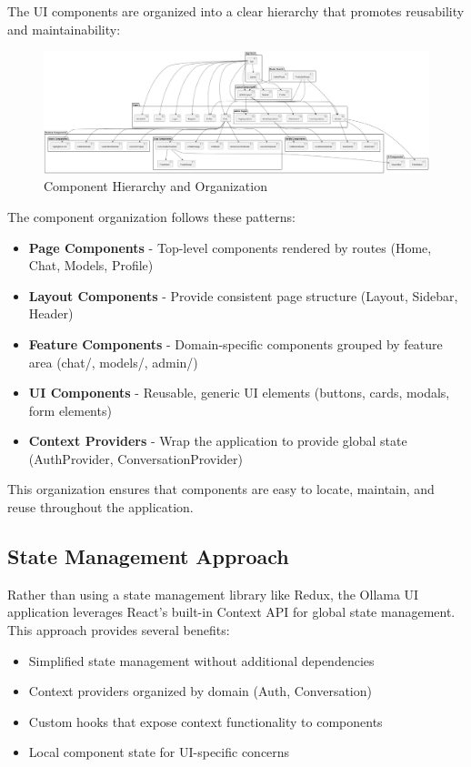 The UI components are organized into a clear hierarchy that promotes reusability and maintainability:

\begin{figure}[p]
    \centering
    \includegraphics[width=\textwidth]{./Chapter07/figures/component_hierarchy.png}
    \caption{Component Hierarchy and Organization}
    \label{fig:component-hierarchy}
\end{figure}
\clearpage

The component organization follows these patterns:

\begin{itemize}
  \item \textbf{Page Components} - Top-level components rendered by routes (Home, Chat, Models, Profile)
  \item \textbf{Layout Components} - Provide consistent page structure (Layout, Sidebar, Header)
  \item \textbf{Feature Components} - Domain-specific components grouped by feature area (chat/, models/, admin/)
  \item \textbf{UI Components} - Reusable, generic UI elements (buttons, cards, modals, form elements)
  \item \textbf{Context Providers} - Wrap the application to provide global state (AuthProvider, ConversationProvider)
\end{itemize}

This organization ensures that components are easy to locate, maintain, and reuse throughout the application.

\subsection{State Management Approach}

Rather than using a state management library like Redux, the Ollama UI application leverages React's built-in Context API for global state management. This approach provides several benefits:

\begin{itemize}
  \item Simplified state management without additional dependencies
  \item Context providers organized by domain (Auth, Conversation)
  \item Custom hooks that expose context functionality to components
  \item Local component state for UI-specific concerns
\end{itemize}


